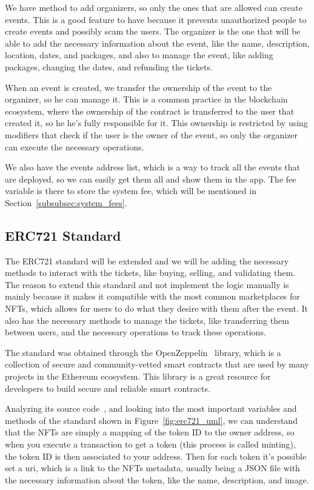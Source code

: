 We have method to add organizers, so only the ones that are allowed can create
events. This is a good feature to have because it prevents unauthorized people
to create events and possibly scam the users. The organizer is the one that
will be able to add the necessary information about the event, like the name,
description, location, dates, and packages, and also to manage the event, like
adding packages, changing the dates, and refunding the tickets.

When an event is created, we transfer the ownership of the event to the
organizer, so he can manage it. This is a common practice in the blockchain
ecosystem, where the ownership of the contract is transferred to the user that
created it, so he he's fully responsible for it. This ownership is restricted
by using modifiers that check if the user is the owner of the event, so only
the organizer can execute the necessary operations.

We also have the events address list, which is a way to track all the events
that are deployed, so we can easily get them all and show them in the app. The
fee variable is there to store the system fee, which will be mentioned in
Section~\ref{subsubsec:system_fees}.

\subsection{ERC721 Standard}\label{subsec:erc721_standard}

The ERC721 standard will be extended and we will be adding the necessary
methods to interact with the tickets, like buying, selling, and validating
them. The reason to extend this standard and not implement the logic manually
is mainly because it makes it compatible with the most common marketplaces for
NFTs, which allows for users to do what they desire with them after the event.
It also has the necessary methods to manage the tickets, like transferring them
between users, and the necessary operations to track these operations.

The standard was obtained through the OpenZeppelin~\cite{openzeppelin} library,
which is a collection of secure and community-vetted smart contracts that are
used by many projects in the Ethereum ecosystem. This library is a great
resource for developers to build secure and reliable smart contracts.

Analyzing its source code~\cite{erc721_github}, and looking into the most
important variables and methods of the standard shown in
Figure~\ref{fig:erc721_uml}, we can understand that the NFTs are simply a
mapping of the token ID to the owner address, so when you execute a transaction
to get a token (this process is called minting), the token ID is then
associated to your address. Then for each token it's possible set a \gls{uri},
which is a link to the NFTs metadata, usually being a JSON file with the
necessary information about the token, like the name, description, and image.

